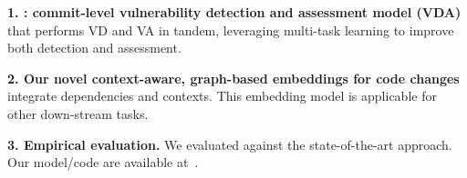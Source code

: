 {\bf 1. {\tool}: commit-level vulnerability detection and assessment
  model (VDA)} that performs VD and VA in tandem, leveraging multi-task
learning to improve both detection and assessment.


{\bf 2. Our novel context-aware, graph-based embeddings for code
  changes}
integrate dependencies and contexts. This embedding model
is applicable for other down-stream tasks.


{\bf 3. Empirical evaluation.} We evaluated {\tool}
against the state-of-the-art approach.
Our model/code are available at~\cite{cat-website}.

